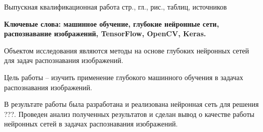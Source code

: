
Выпускная квалификационная работа \pageref{LastPage} стр., 
 гл., 
\totalfigures{} рис.,
\totaltables{} таблиц,
 источников

\textbf{Ключевые слова: машинное обучение, глубокие нейронные сети, распознавание изображений, TensorFlow, OpenCV, Keras.}

Объектом исследования являются методы на основе глубоких нейронных сетей для задач распознавания изображений. 

Цель работы – изучить применение глубокого машинного обучения в задачах распознавания изображений.

В результате работы была разработана и реализована нейронная сеть для решения ???. Проведен анализ полученных результатов и сделан вывод о качестве работы нейронных сетей в задачах распознавания изображений.

\clearpage
